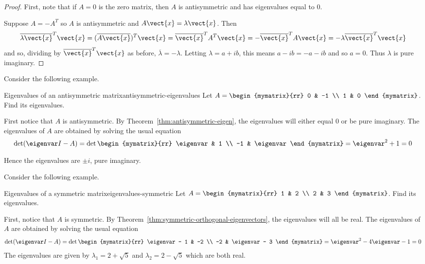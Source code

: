 \begin{proof}
First, note that if $A=0$ is the zero matrix, then $A$ is antisymmetric and has eigenvalues equal to $0$.

Suppose $A=-A^{T}$ so $A$ is antisymmetric and $A\vect{x}=\lambda
\vect{x}$. Then
\begin{equation*}
\overline{\lambda \vect{x}}^{T}\vect{x}=(\overline{A
\vect{x}}) ^{T}\vect{x}=\overline{\vect{x}}^{T}A^{T}\vect{x}=-
\overline{\vect{x}}^{T}A\vect{x}=-\lambda \overline{\vect{x}}^{T}
\vect{x}
\end{equation*}
and so, dividing by $\overline{\vect{x}}^{T}\vect{x}$ as before, $
\overline{\lambda }=-\lambda$. Letting $\lambda =a+ib$, this means $
a-ib=-a-ib$ and so $a=0$. Thus $\lambda $ is pure imaginary.
\end{proof}

Consider the following example.

\begin{example}{Eigenvalues of an antisymmetric matrix}{antisymmetric-eigenvalues}
Let $A=\begin{mymatrix}{rr}
0 & -1 \\
1 & 0
\end{mymatrix}$.  Find its eigenvalues.
\end{example}

\begin{solution}
First notice that $A$ is antisymmetric. By Theorem~\ref{thm:antisymmetric-eigen}, the eigenvalues will either equal $0$ or be pure imaginary.  The eigenvalues of $A$ are obtained by solving the usual equation
\[
\det (\eigenvar I - A ) =
\det \begin{mymatrix}{rr}
\eigenvar & 1 \\
-1 & \eigenvar
\end{mymatrix} =\eigenvar ^{2}+1=0
\]

Hence the eigenvalues are $\pm i$, pure
imaginary.
\end{solution}

Consider the following example.

\begin{example}{Eigenvalues of a symmetric matrix}{eigenvalues-symmetric}
Let $A=\begin{mymatrix}{rr}
1 & 2 \\
2 & 3
\end{mymatrix}$. Find its eigenvalues.
\end{example}

\begin{solution}
First, notice that $A$ is symmetric. By Theorem~\ref{thm:symmetric-orthogonal-eigenvectors}, the eigenvalues will all be real. The eigenvalues of $A$ are obtained by solving the usual equation
\[
\det (\eigenvar I - A) =
\det \begin{mymatrix}{rr}
\eigenvar - 1 & -2 \\
-2 & \eigenvar - 3
\end{mymatrix} = \eigenvar^2 -4\eigenvar -1=0
\]
The eigenvalues are given by $\lambda_1 =2+
\sqrt{5}$ and $\lambda_2 =2-\sqrt{5}$ which are both real.
\end{solution}

